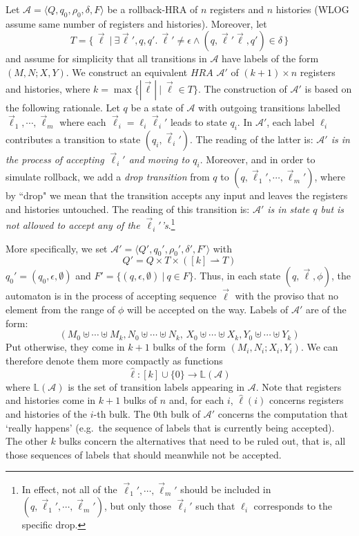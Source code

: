 \documentclass{article}
\theoremstyle{definition}
\renewcommand\AA{\mathcal{A}}
\renewcommand\L{\mathbb{L}}
\newcommand\ta{,}
\begin{document}
Let $\AA=\langle Q,q_0,\rho_0,\delta,F\rangle$ be a rollback-HRA of $n$ registers and $n$ histories (WLOG assume same number of registers and histories). 
Moreover, let 
\[
T=\{\, \vec{\ell}\ |\ \exists\vec\ell',q,q'.\,\vec\ell'\not=\epsilon\land (q,\vec\ell'\vec\ell,q')\in\delta\,\}
\]
and assume for simplicity that all transitions in $\AA$ have labels of the form $(M\ta N;X\ta Y)$.
We construct an equivalent $HRA$ $\AA'$ of $(k+1)\times n$ registers and histories, where $k=\max\{|\vec\ell|\ |\ \vec\ell\in T\}$.
The construction of $\AA'$ is based on the following rationale. Let $q$ be a state of $\AA$ with outgoing transitions labelled $\vec\ell_1,\cdots,\vec\ell_m$ where each $\vec\ell_i=\ell_i\vec\ell_i'$ leads to state $q_i$. In $\AA'$, each label $\ell_i$ contributes a transition to state $(q_i,\vec\ell_i')$. The reading of the latter is: 
\emph{$\AA'$ is in the process of accepting $\vec\ell_i'$ and moving to $q_i$}.
Moreover, and in order to simulate rollback, we add a \emph{drop transition} from $q$ to $(q,\vec\ell_1',\cdots,\vec\ell_m')$, where by ``drop" we mean that the transition accepts any input and leaves the registers and histories untouched. The reading of this transition is:
\emph{$\AA'$ is in state $q$ but is not allowed to accept any of the $\vec\ell_i'$'s}.\footnote{In effect, not all of the $\vec\ell_1',\cdots,\vec\ell_m'$ should be included in $(q,\vec\ell_1',\cdots,\vec\ell_m')$, but only those $\vec\ell_i'$ such that $\ell_i$ corresponds to the specific drop.}

More specifically, we set $\AA'=\langle Q',q_0',\rho_0',\delta',F'\rangle$ with 
\[
Q' = Q\times T\times ([k]\rightharpoonup T)
\]
$q_0'=(q_0,\epsilon,\emptyset)$ and $F'=\{(q,\epsilon,\emptyset)\ |\ q\in F\}$.
Thus, in each state $(q,\vec\ell,\phi)$, the automaton is in the process of accepting sequence $\vec\ell$ with the proviso that no element from the range of $\phi$ will be accepted on the way.
Labels of $\AA'$ are of the form:
\[
(M_0\uplus\cdots\uplus M_k\ta N_0\uplus\cdots\uplus N_k,\,X_0\uplus\cdots\uplus X_k\ta Y_0\uplus\cdots\uplus Y_k)
\]
Put otherwise, they come in $k+1$ bulks of the form $(M_i\ta N_i;X_i\ta Y_i)$.
We can therefore denote them more compactly as functions
\[
\hat\ell: [k]\cup\{0\}\to\L(\AA)
\]
where $\L(\AA)$ is the set of transition labels appearing in $\AA$. Note that registers and histories come in $k+1$ bulks of $n$ and, for each $i$, $\hat\ell(i)$ concerns registers and histories of the $i$-th bulk. The 0th bulk of $\AA'$ concerns the computation that `really happens' (e.g.\ the sequence of labels that is currently being accepted). The other $k$ bulks concern the alternatives that need to be ruled out, that is, all those sequences of labels that should meanwhile not be accepted.
\end{document}

